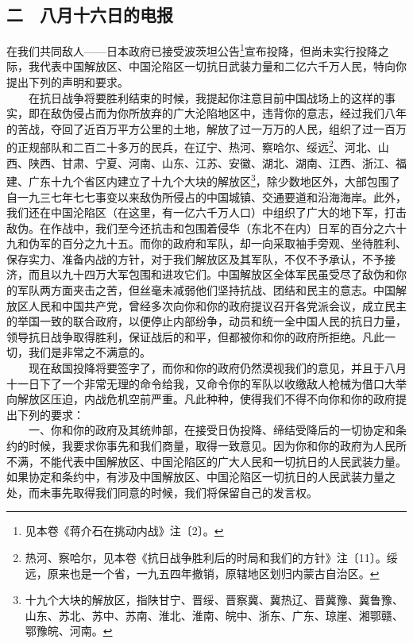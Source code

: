 \documentclass[cn,11pt,chinese]{elegantbook}
\def\myformat#1{\hfil\hfil #1}
\begin{document}
\subsection*{\myformat{二　八月十六日的电报}}
在我们共同敌人——日本政府已接受波茨坦公告\footnote[2]{ 见本卷《蒋介石在挑动内战》注〔2〕。}宣布投降，但尚未实行投降之际，我代表中国解放区、中国沦陷区一切抗日武装力量和二亿六千万人民，特向你提出下列的声明和要求。\\
　　在抗日战争将要胜利结束的时候，我提起你注意目前中国战场上的这样的事实，即在敌伪侵占而为你所放弃的广大沦陷地区中，违背你的意志，经过我们八年的苦战，夺回了近百万平方公里的土地，解放了过一万万的人民，组织了过一百万的正规部队和二百二十多万的民兵，在辽宁、热河、察哈尔、绥远\footnote[3]{ 热河、察哈尔，见本卷《抗日战争胜利后的时局和我们的方针》注〔11〕。绥远，原来也是一个省，一九五四年撤销，原辖地区划归内蒙古自治区。}、河北、山西、陕西、甘肃、宁夏、河南、山东、江苏、安徽、湖北、湖南、江西、浙江、福建、广东十九个省区内建立了十九个大块的解放区\footnote[4]{ 十九个大块的解放区，指陕甘宁、晋绥、晋察冀、冀热辽、晋冀豫、冀鲁豫、山东、苏北、苏中、苏南、淮北、淮南、皖中、浙东、广东、琼崖、湘鄂赣、鄂豫皖、河南。}，除少数地区外，大部包围了自一九三七年七七事变以来敌伪所侵占的中国城镇、交通要道和沿海海岸。此外，我们还在中国沦陷区（在这里，有一亿六千万人口）中组织了广大的地下军，打击敌伪。在作战中，我们至今还抗击和包围着侵华（东北不在内）日军的百分之六十九和伪军的百分之九十五。而你的政府和军队，却一向采取袖手旁观、坐待胜利、保存实力、准备内战的方针，对于我们解放区及其军队，不仅不予承认，不予接济，而且以九十四万大军包围和进攻它们。中国解放区全体军民虽受尽了敌伪和你的军队两方面夹击之苦，但丝毫未减弱他们坚持抗战、团结和民主的意志。中国解放区人民和中国共产党，曾经多次向你和你的政府提议召开各党派会议，成立民主的举国一致的联合政府，以便停止内部纷争，动员和统一全中国人民的抗日力量，领导抗日战争取得胜利，保证战后的和平，但都被你和你的政府所拒绝。凡此一切，我们是非常之不满意的。\\
　　现在敌国投降将要签字了，而你和你的政府仍然漠视我们的意见，并且于八月十一日下了一个非常无理的命令给我，又命令你的军队以收缴敌人枪械为借口大举向解放区压迫，内战危机空前严重。凡此种种，使得我们不得不向你和你的政府提出下列的要求：\\
　　一、你和你的政府及其统帅部，在接受日伪投降、缔结受降后的一切协定和条约的时候，我要求你事先和我们商量，取得一致意见。因为你和你的政府为人民所不满，不能代表中国解放区、中国沦陷区的广大人民和一切抗日的人民武装力量。如果协定和条约中，有涉及中国解放区、中国沦陷区一切抗日的人民武装力量之处，而未事先取得我们同意的时候，我们将保留自己的发言权。\\
\end{document}

